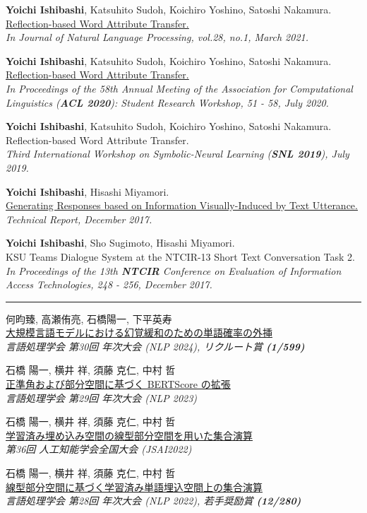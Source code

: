 \documentclass[11pt,letterpaper]{article}
\let\oldhref\href
\renewcommand{\href}[2]{\oldhref{#1}{\uline{#2}}}
\newlength{\labelcol}\setlength{\labelcol}{1.2in}
\newlength{\labelgap}\setlength{\labelgap}{0.21in}
\newcommand{\cvsection}[1]{%
  \par\vspace{26pt}%
  {\noindent\rule{\textwidth}{2.4pt}\par}\nopagebreak\vspace{9pt}%
  \noindent\llap{\smash[b]{\parbox[t]{\labelcol}{\raggedright\large\bfseries #1}}\hspace{\labelgap}}\ignorespaces}
\newcommand{\paper}[3]{\par\vspace{12pt}\noindent #1\\ #2\\ {\itshape #3}\par}
\newcommand{\paperfirst}[3]{#1\\ #2\\ {\itshape #3}\par}
\begin{document}
\paper{\textbf{Yoichi Ishibashi}, Katsuhito Sudoh, Koichiro Yoshino, Satoshi Nakamura.}
{\href{https://www.jstage.jst.go.jp/article/jnlp/28/1/28_206/_article/-char/en}{Reflection-based Word Attribute Transfer.}}
{In Journal of Natural Language Processing, vol.28, no.1, March 2021.}

\paper{\textbf{Yoichi Ishibashi}, Katsuhito Sudoh, Koichiro Yoshino, Satoshi Nakamura.}
{\href{https://www.aclweb.org/anthology/2020.acl-srw.8/}{Reflection-based Word Attribute Transfer.}}
{In Proceedings of the 58th Annual Meeting of the Association for Computational Linguistics (\textbf{ACL 2020}): Student Research Workshop, 51 - 58, July 2020.}

\paper{\textbf{Yoichi Ishibashi}, Katsuhito Sudoh, Koichiro Yoshino, Satoshi Nakamura.}
{Reflection-based Word Attribute Transfer.}
{Third International Workshop on Symbolic-Neural Learning (\textbf{SNL 2019}), July 2019.}

\paper{\textbf{Yoichi Ishibashi}, Hisashi Miyamori.}
{\href{https://yoichi1484.github.io/projects/shizuka/doc/INLG2019/paper/paper_final2019.pdf}{Generating Responses based on Information Visually-Induced by Text Utterance.}}
{Technical Report, December 2017.}

\paper{\textbf{Yoichi Ishibashi}, Sho Sugimoto, Hisashi Miyamori.}
{KSU Teams Dialogue System at the NTCIR-13 Short Text Conversation Task 2.}
{In Proceedings of the 13th \textbf{NTCIR} Conference on Evaluation of Information Access Technologies, 248 - 256, December 2017.}

\cvsection{Domestic Conferences}%
\paperfirst{何昀臻, 高瀬侑亮, 石橋陽一, 下平英寿}
{\href{https://www.anlp.jp/proceedings/annual_meeting/2024/pdf_dir/P6-21.pdf}{大規模言語モデルにおける幻覚緩和のための単語確率の外挿}}
{\upshape 言語処理学会 第30回 年次大会 (NLP 2024), リクルート賞 \textbf{(1/599)}}

\paper{石橋 陽一, 横井 祥, 須藤 克仁, 中村 哲}
{\href{https://www.anlp.jp/proceedings/annual_meeting/2023/pdf_dir/C4-1.pdf}{正準角および部分空間に基づく BERTScore の拡張}}
{\upshape 言語処理学会 第29回 年次大会 (NLP 2023)}

\paper{石橋 陽一, 横井 祥, 須藤 克仁, 中村 哲}
{\href{https://www.jstage.jst.go.jp/article/pjsai/JSAI2022/0/JSAI2022_1P4GS602/_article/-char/en}{学習済み埋め込み空間の線型部分空間を用いた集合演算}}
{\upshape 第36回 人工知能学会全国大会 (JSAI2022)}

\paper{石橋 陽一, 横井 祥, 須藤 克仁, 中村 哲}
{\href{https://www.anlp.jp/proceedings/annual_meeting/2022/pdf_dir/PH2-8.pdf}{線型部分空間に基づく学習済み単語埋込空間上の集合演算}}
{\upshape 言語処理学会 第28回 年次大会 (NLP 2022), 若手奨励賞 \textbf{(12/280)}}
\end{document}
